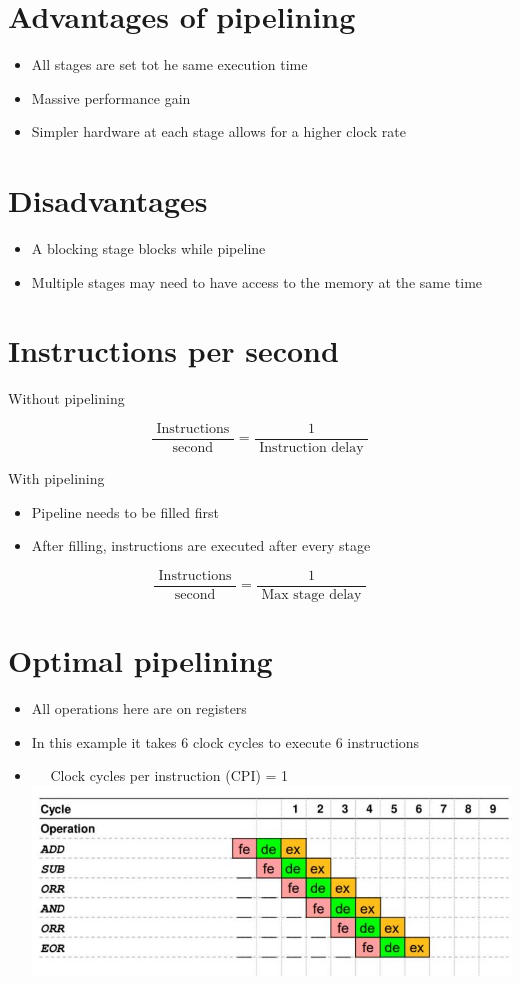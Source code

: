 \documentclass[10pt]{article}
\begin{document}
\section*{Advantages of pipelining}
\begin{itemize}
  \item All stages are set tot he same execution time
  \item Massive performance gain
  \item Simpler hardware at each stage allows for a higher clock rate
\end{itemize}

\section*{Disadvantages}
\begin{itemize}
  \item A blocking stage blocks while pipeline
  \item Multiple stages may need to have access to the memory at the same time
\end{itemize}

\section*{Instructions per second}
Without pipelining

$$
\frac{\text { Instructions }}{\text { second }}=\frac{1}{\text { Instruction delay }}
$$

With pipelining

\begin{itemize}
  \item Pipeline needs to be filled first
  \item After filling, instructions are executed after every stage
\end{itemize}

$$
\frac{\text { Instructions }}{\text { second }}=\frac{1}{\text { Max stage delay }}
$$

\section*{Optimal pipelining}
\begin{itemize}
  \item All operations here are on registers
  \item In this example it takes 6 clock cycles to execute 6 instructions
  \item $\quad$ Clock cycles per instruction (CPI) = 1\\
\includegraphics[width=\linewidth]{images/2024_12_29_79e6b22f503fb7b4f718g-14}
\end{itemize}
\end{document}
